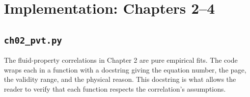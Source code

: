 \documentclass[11pt,a4paper,openany]{book}
\newcommand{\code}[1]{\texttt{#1}}
\begin{document}
\chapter{Implementation: Chapters 2--4}

\section{\code{ch02\_pvt.py}}

\begin{theory}
The fluid-property correlations in Chapter 2 are pure empirical fits.
The code wraps each in a function with a docstring giving the equation
number, the page, the validity range, and the physical reason. This
docstring is what allows the reader to verify that each function
respects the correlation's assumptions.
\end{theory}
\end{document}
